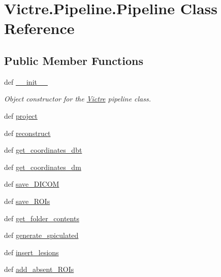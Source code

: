 \hypertarget{classVictre_1_1Pipeline_1_1Pipeline}{\section{Victre.\-Pipeline.\-Pipeline Class Reference}
\label{classVictre_1_1Pipeline_1_1Pipeline}
}
\subsection*{Public Member Functions}
\begin{DoxyCompactItemize}
\item 
def \hyperlink{classVictre_1_1Pipeline_1_1Pipeline_a45627045131474e1dc8c218655aee2b2}{\-\_\-\-\_\-init\-\_\-\-\_\-}
\begin{DoxyCompactList}\small\item\em Object constructor for the \hyperlink{namespaceVictre}{Victre} pipeline class. \end{DoxyCompactList}\item 
def \hyperlink{classVictre_1_1Pipeline_1_1Pipeline_a372ba5d565da4224e4768316ac640f99}{project}
\item 
def \hyperlink{classVictre_1_1Pipeline_1_1Pipeline_ab7dbcc6b27ab4e563391e2d76045f609}{reconstruct}
\item 
def \hyperlink{classVictre_1_1Pipeline_1_1Pipeline_a27d92d6338fea609839441a7f644ae41}{get\-\_\-coordinates\-\_\-dbt}
\item 
def \hyperlink{classVictre_1_1Pipeline_1_1Pipeline_a404619920d58648ef74e6307d8b6a7dc}{get\-\_\-coordinates\-\_\-dm}
\item 
def \hyperlink{classVictre_1_1Pipeline_1_1Pipeline_a38cf3bb515b5c52d4010867bc3dfc1d0}{save\-\_\-\-D\-I\-C\-O\-M}
\item 
def \hyperlink{classVictre_1_1Pipeline_1_1Pipeline_ab41af48a6a0860907671a80d4d1fffd6}{save\-\_\-\-R\-O\-Is}
\item 
def \hyperlink{classVictre_1_1Pipeline_1_1Pipeline_ae6bc9a133eb885f8aa605ff80fc7f784}{get\-\_\-folder\-\_\-contents}
\item 
def \hyperlink{classVictre_1_1Pipeline_1_1Pipeline_aa63a440812d2bbeec712e6c4f9054f1d}{generate\-\_\-spiculated}
\item 
def \hyperlink{classVictre_1_1Pipeline_1_1Pipeline_aab8f3f01f7247868aecd5bac81323263}{insert\-\_\-lesions}
\item 
def \hyperlink{classVictre_1_1Pipeline_1_1Pipeline_a6ed9f1e6df840d9a5753860de0312272}{add\-\_\-absent\-\_\-\-R\-O\-Is}
\end{DoxyCompactItemize}
